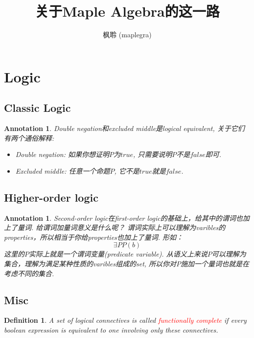 \documentclass{article}
\newtheorem{definition}[theorem]{Definition}
\newtheorem{annotation}[theorem]{Annotation}
\newcommand{\redt}[1]{\textcolor{red}{#1}}
\begin{document}
\title{关于Maple Algebra的这一路}
\author{枫聆 (maplegra)}
\maketitle
\tableofcontents
\newpage

\section{Logic}

\subsection{Classic Logic}

\begin{annotation}
\rm Double negation和excluded middle是logical equivalent, 关于它们有两个通俗解释:
\begin{itemize}
	\item Double negation: 如果你想证明$P$为$true$, 只需要说明$P$不是$false$即可.
	\item Excluded middle: 任意一个命题$P$, 它不是$true$就是$false$.
\end{itemize}
\end{annotation}

\subsection{Higher-order logic}

\begin{annotation}
\rm Second-order logic在first-order logic的基础上，给其中的谓词也加上了量词. 给谓词加量词意义是什么呢？ 谓词实际上可以理解为varibles的properties，所以相当于你给properties也加上了量词. 形如：
\[
	\exists P P(b)
\]
这里的$P$实际上就是一个谓词变量(predicate variable). 从语义上来说$P$可以理解为集合，理解为满足某种性质的varibles组成的set, 所以你对$P$施加一个量词也就是在考虑不同的集合. 
\end{annotation}

\subsection{Misc}

\begin{definition}
\rm A set of logical connectives is called \redt{functionally complete} if every boolean expression is equivalent to one involving only these connectives.
\end{definition}
\end{document}
